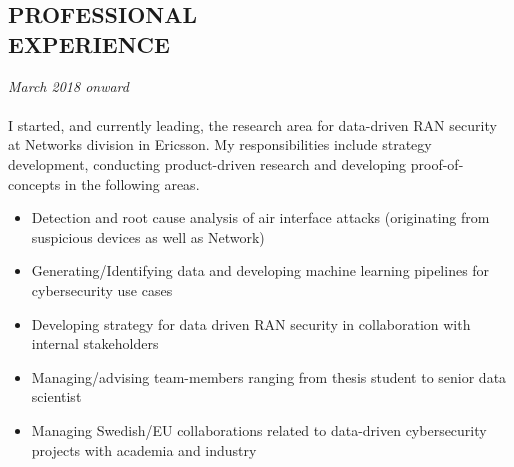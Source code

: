 \documentclass[margin, 10pt]{res} %
\begin{document}
\begin{resume}
\section{PROFESSIONAL \\ EXPERIENCE}

{\sl \textbf{}} \hfill \textit{March 2018 onward} \\
{\color{RubineRed}{Ericsson AB, Sweden}} \\
I started, and currently leading, the research area for data-driven RAN security at Networks division in Ericsson. 
My responsibilities include strategy development, conducting product-driven research and developing proof-of-concepts 
in the following areas.

\begin{itemize}
    \item Detection and root cause analysis of air interface attacks (originating from suspicious devices as well as Network)
    \item Generating/Identifying data and developing machine learning pipelines for cybersecurity use cases
    \item Developing strategy for data driven RAN security in collaboration with internal stakeholders
    \item Managing/advising team-members ranging from thesis student to senior data scientist
    \item Managing Swedish/EU collaborations related to data-driven cybersecurity projects with academia and industry
\end{itemize}


\end{resume}
\end{document}
